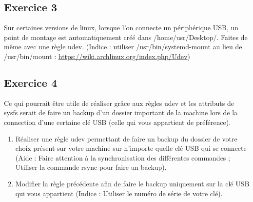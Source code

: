 \documentclass[11pt]{article}
\begin{document}
\subsection*{Exercice 3}

Sur certaines versions de linux, lorsque l'on connecte un périphérique USB, un point de montage 
est automatiquement créé dans /home/usr/Desktop/. Faites de même avec une règle udev. 
(Indice : utiliser /usr/bin/systemd-mount au lieu de /usr/bin/mount : \url{https://wiki.archlinux.org/index.php/Udev})

 \bigskip \newpage

\subsection*{Exercice 4}

Ce qui pourrait être utile de réaliser grâce aux règles udev et les attributs de sysfs serait de faire un backup d'un dossier important de la machine lors de la connection d'une certaine clé USB (celle qui vous appartient de préférence). 

\begin{enumerate}
	\item Réaliser une règle udev permettant de faire un backup du dossier de votre choix présent sur votre machine sur n'importe quelle clé USB qui se connecte (Aide : Faire attention à la synchronisation des différentes commandes ; Utiliser la commande rsync pour faire un backup).
	
	 \bigskip
	
	 \bigskip
	
	 \bigskip

	\item Modifier la règle précédente afin de faire le backup uniquement sur la clé USB qui vous appartient (Indice : Utiliser le numéro de série de votre clé).
	
	 \bigskip
	
		
	
\end{enumerate}
\end{document}
